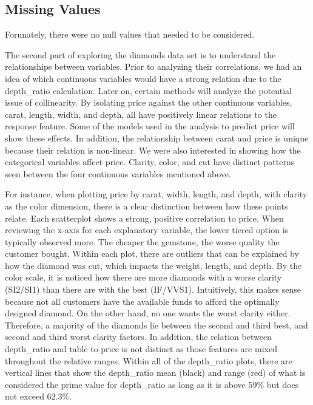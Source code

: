 \documentclass[
  paper=a4,
  ,captions=tableheading
]{scrartcl}
\begin{document}
\hypertarget{missing-values}{%
\subsection{Missing Values}\label{missing-values}}

Forunately, there were no null values that needed to be considered.

The second part of exploring the diamonds data set is to understand the
relationships between variables. Prior to analyzing their correlations,
we had an idea of which continuous variables would have a strong
relation due to the depth\_ratio calculation. Later on, certain methods
will analyze the potential issue of collinearity. By isolating price
against the other continuous variables, carat, length, width, and depth,
all have positively linear relations to the response feature. Some of
the models used in the analysis to predict price will show these
effects. In addition, the relationship between carat and price is unique
because their relation is non-linear. We were also interested in showing
how the categorical variables affect price. Clarity, color, and cut have
distinct patterns seen between the four continuous variables mentioned
above.

For instance, when plotting price by carat, width, length, and depth,
with clarity as the color dimension, there is a clear distinction
between how these points relate. Each scatterplot shows a strong,
positive correlation to price. When reviewing the x-axis for each
explanatory variable, the lower tiered option is typically observed
more. The cheaper the gemstone, the worse quality the customer bought.
Within each plot, there are outliers that can be explained by how the
diamond was cut, which impacts the weight, length, and depth. By the
color scale, it is noticed how there are more diamonds with a worse
clarity (SI2/SI1) than there are with the best (IF/VVS1). Intuitively,
this makes sense because not all customers have the available funds to
afford the optimally designed diamond. On the other hand, no one wants
the worst clarity either. Therefore, a majority of the diamonds lie
between the second and third best, and second and third worst clarity
factors. In addition, the relation between depth\_ratio and table to
price is not distinct as those features are mixed throughout the
relative ranges. Within all of the depth\_ratio plots, there are
vertical lines that show the depth\_ratio mean (black) and range (red)
of what is considered the prime value for depth\_ratio as long as it is
above 59\% but does not exceed 62.3\%.
\end{document}
